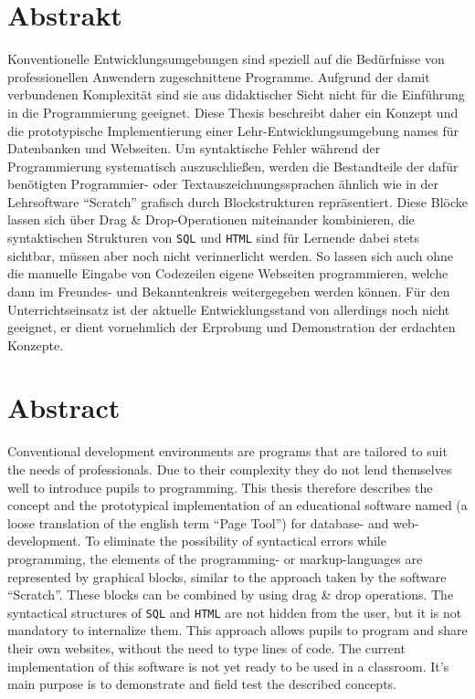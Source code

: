 \begin{titlepage}

\section*{Abstrakt}

Konventionelle Entwicklungsumgebungen sind speziell auf die Bedürfnisse von professionellen Anwendern zugeschnittene Programme. Aufgrund der damit verbundenen Komplexität sind sie aus didaktischer Sicht nicht für die Einführung in die Programmierung geeignet. Diese Thesis beschreibt daher ein Konzept und die prototypische Implementierung einer Lehr-Entwicklungsumgebung names \idename{} für Datenbanken und Webseiten. Um syntaktische Fehler während der Programmierung systematisch auszuschließen, werden die Bestandteile der dafür benötigten Programmier- oder Textauszeichnungssprachen ähnlich wie in der Lehrsoftware "`Scratch"' grafisch durch Blockstrukturen repräsentiert. Diese Blöcke lassen sich über Drag \& Drop-Operationen miteinander kombinieren, die syntaktischen Strukturen von \texttt{SQL} und \texttt{HTML} sind für Lernende dabei stets sichtbar, müssen aber noch nicht verinnerlicht werden. So lassen sich auch ohne die manuelle Eingabe von Codezeilen eigene Webseiten programmieren, welche dann im Freundes- und Bekanntenkreis weitergegeben werden können. Für den Unterrichtseinsatz ist der aktuelle Entwicklungsstand von \idename{} allerdings noch nicht geeignet, er dient vornehmlich der Erprobung und Demonstration der erdachten Konzepte.

\section*{Abstract}

Conventional development environments are programs that are tailored to suit the needs of professionals. Due to their complexity they do not lend themselves well to introduce pupils to programming. This thesis therefore describes the concept and the prototypical implementation of an educational software named \idename{} (a loose translation of the english term ``Page Tool'') for database- and web-development. To eliminate the possibility of syntactical errors while programming, the elements of the programming- or markup-languages are represented by graphical blocks, similar to the approach taken by the software ``Scratch''. These blocks can be combined by using drag \& drop operations. The syntactical structures of \texttt{SQL} and \texttt{HTML} are not hidden from the user, but it is not mandatory to internalize them. This approach allows pupils to program and share their own websites, without the need to type lines of code. The current implementation of this software is not yet ready to be used in a classroom. It's main purpose is to demonstrate and field test the described concepts.

\end{titlepage}

